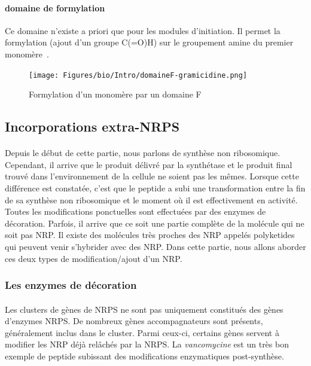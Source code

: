 \documentclass[12pt,french,twoside]{report}
\begin{document}
\paragraph{domaine de formylation}

Ce domaine n'existe a priori que pour les modules d'initiation.
Il permet la formylation (ajout d'un groupe C(=O)H) sur le groupement amine du premier monomère~\cite{schonafinger_amide_2007}.

\begin{figure}[h!]
  \begin{center}
    \texttt{[image: Figures/bio/Intro/domaineF-gramicidine.png]}
    \caption{\label{domaine_F}Formylation d'un monomère par un domaine F}
  \end{center}
\end{figure}


\subsection{Incorporations extra-NRPS}

\paragraph{}Depuis le début de cette partie, nous parlons de synthèse non ribosomique.
Cependant, il arrive que le produit délivré par la synthétase et le produit final trouvé dans l'environnement de la cellule ne soient pas les mêmes.
Lorsque cette différence est constatée, c'est que le peptide a subi une transformation entre la fin de sa synthèse non ribosomique et le moment où il est effectivement en activité.
Toutes les modifications ponctuelles sont effectuées par des enzymes de décoration.
Parfois, il arrive que ce soit une partie complète de la molécule qui ne soit pas NRP.
Il existe des molécules très proches des NRP appelés polyketides qui peuvent venir s'hybrider avec des NRP.
Dans cette partie, nous allons aborder ces deux types de modification/ajout d'un NRP.


\subsubsection{Les enzymes de décoration}

\label{sucres}

\paragraph{}Les clusters de gènes de NRPS ne sont pas uniquement constitués des gènes d'enzymes NRPS.
De nombreux gènes accompagnateurs sont présents, généralement inclus dans le cluster.
Parmi ceux-ci, certains gènes servent à modifier les NRP déjà relâchés par la NRPS.
La \textit{vancomycine} est un très bon exemple de peptide subissant des modifications enzymatiques post-synthèse.
\end{document}
